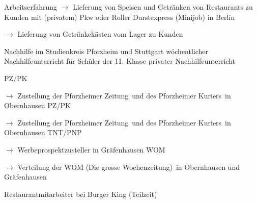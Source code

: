 \begin{rubric}{\textcolor{black!20!blue!100}{Arbeitserfahrung}}
			\setlength{\hangindent}{\widthof{$\rightarrow$ }}
			$\rightarrow$ Lieferung von Speisen und Getränken von Restaurants zu Kunden mit (privatem) Pkw oder Roller
		\entry*[17/07/2020 --- 18/10/2020]
			Durstexpress (Minijob) in Berlin
			
			\setlength{\hangindent}{\widthof{$\rightarrow$ }}
			$\rightarrow$ Lieferung von Getränkekästen vom Lager zu Kunden
				
		\entry*[10/2015 --- 01/2016]
			Nachhilfe im Studienkreis Pforzheim und Stuttgart
		\entry*[10/2011 --- 06/2012]
			wöchentlicher Nachhilfeunterricht für Schüler der 11. Klasse
		\entry*[\phantom{10/}2010 --- 2016]
			privater Nachhilfeunterricht
			
		\entry*[08/2015 --- 09/2015]
			PZ/PK
			
			\setlength{\hangindent}{\widthof{$\rightarrow$ }}
			$\rightarrow$ Zustellung der \glqq Pforzheimer Zeitung\grqq\ und des \glqq Pforzheimer Kuriers\grqq\ in Obernhausen
		\entry*[08/2012 --- 09/2012]
			PZ/PK
			
			\setlength{\hangindent}{\widthof{$\rightarrow$ }}
			$\rightarrow$ Zustellung der \glqq Pforzheimer Zeitung\grqq\ und des \glqq Pforzheimer Kuriers\grqq\ in Obernhausen
		\entry*[06/2009 --- 10/2010]
			TNT/PNP
			
			\setlength{\hangindent}{\widthof{$\rightarrow$ }}
			$\rightarrow$ Werbeprospektzusteller in Gräfenhausen
		\entry*[06/2007 --- 12/2008]
			WOM
			
			\setlength{\hangindent}{\widthof{$\rightarrow$ }}
			$\rightarrow$ Verteilung der \glqq WOM (Die grosse Wochenzeitung)\grqq\ in Obernhausen und Gräfenhausen
			
		\entry*[04/2012 --- 10/2012]
			Restaurantmitarbeiter bei Burger King (Teilzeit)
\end{rubric}